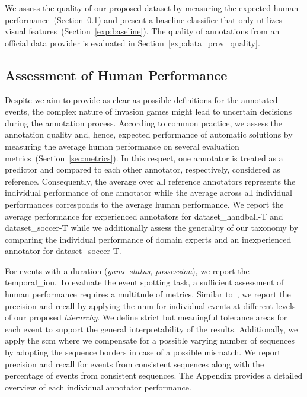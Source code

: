 We assess the quality of our proposed dataset by measuring the expected human performance~(Section~\ref{exp:aggreement}) and present a baseline classifier that only utilizes visual features~(Section~\ref{exp:baseline}). 
The %
quality of annotations from an official data provider is evaluated in Section~\ref{exp:data_prov_quality}.

\subsection{Assessment of Human Performance}\label{exp:aggreement}

Despite we aim to provide as clear as possible definitions for the annotated events, the complex nature of invasion games might lead to uncertain decisions during the annotation process.
According to common practice, we assess the annotation quality and, hence, expected performance of automatic solutions by measuring the average human performance on several evaluation metrics~(Section~\ref{sec:metrics}). 
In this respect, one annotator is treated as a predictor and compared to each other annotator, respectively, considered as reference. 
Consequently, the average over all reference annotators represents the individual performance of one annotator while the average across all individual performances corresponds to the average human performance. We report the average performance for experienced annotators for \acrshort{dataset_handball}-T and \acrshort{dataset_soccer}-T while we additionally assess the generality of our taxonomy by comparing the individual performance of domain experts and an inexperienced annotator for \acrshort{dataset_soccer}-T.

For events with a duration (\emph{game status}, \emph{possession}), we report the \acrshort{temporal_iou}.
To evaluate the event spotting task, a sufficient assessment of human performance requires a multitude of metrics. Similar to~\citet{sanford2020group}, we report the precision and recall by applying the \acrshort{nnm} for individual events at different levels of our proposed \textit{hierarchy}. %
We define strict but meaningful tolerance areas for each event to support the general interpretability of the results. 
Additionally, we apply the \acrshort{scm} where we compensate for a possible varying number of sequences by adopting the sequence borders in case of a possible mismatch. 
We report precision and recall for events from consistent sequences along with the percentage of events from consistent sequences. The Appendix provides a detailed overview of each individual annotator performance.

